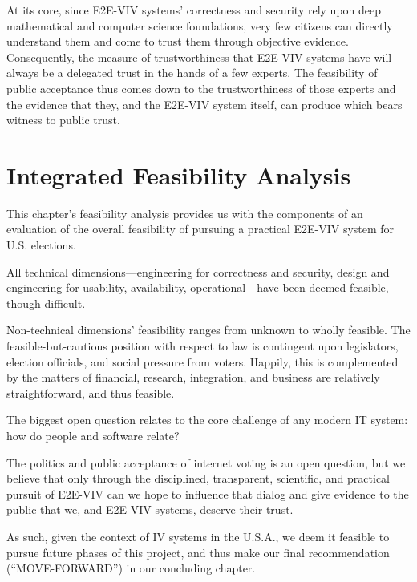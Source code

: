At its core, since E2E-VIV systems' correctness and security rely upon
deep mathematical and computer science foundations, very few citizens
can directly understand them and come to trust them through objective
evidence. Consequently, the measure of trustworthiness that E2E-VIV
systems have will always be a delegated trust in the hands of a few
experts. The feasibility of public acceptance thus comes down to the
trustworthiness of those experts and the evidence that they, and the
E2E-VIV system itself, can produce which bears witness to public
trust.

\section{Integrated Feasibility Analysis}

This chapter's feasibility analysis provides us with the components of
an evaluation of the overall feasibility of pursuing a practical
E2E-VIV system for U.S. elections.

All technical dimensions---engineering for correctness and security,
design and engineering for usability, availability, operational---have
been deemed feasible, though difficult.

Non-technical dimensions' feasibility ranges from unknown to wholly
feasible.  The feasible-but-cautious position with respect to law is
contingent upon legislators, election officials, and social pressure
from voters.  Happily, this is complemented by the matters of
financial, research, integration, and business are relatively
straightforward, and thus feasible.

The biggest open question relates to the core challenge of any modern
IT system: how do people and software relate?

The politics and public acceptance of internet voting is an open
question, but we believe that only through the disciplined,
transparent, scientific, and practical pursuit of E2E-VIV can we hope
to influence that dialog and give evidence to the public that we, and
E2E-VIV systems, deserve their trust.

As such, given the context of IV systems in the U.S.A., we deem it
feasible to pursue future phases of this project, and thus make our
final recommendation (``MOVE-FORWARD'') in our concluding chapter.

